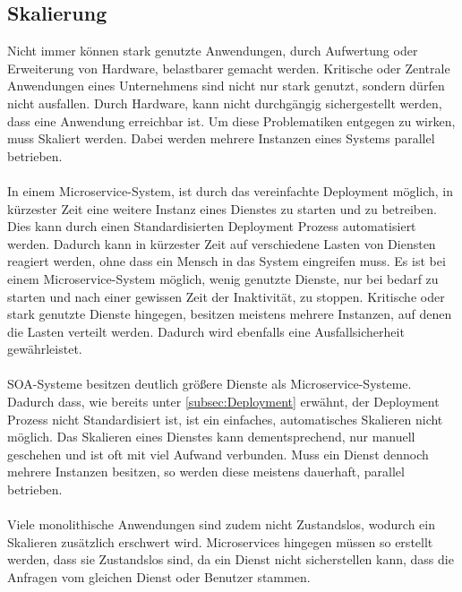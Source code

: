 \subsection{Skalierung}
\label{subsec:Skalierung}
Nicht immer können stark genutzte Anwendungen, durch Aufwertung oder Erweiterung von Hardware, belastbarer gemacht werden. Kritische oder Zentrale Anwendungen eines Unternehmens sind nicht nur stark genutzt, sondern dürfen nicht ausfallen. Durch Hardware, kann nicht durchgängig sichergestellt werden, dass eine Anwendung erreichbar ist. Um diese Problematiken entgegen zu wirken, muss Skaliert werden. Dabei werden mehrere Instanzen eines Systems parallel betrieben.
\\\\
In einem Microservice-System, ist durch das vereinfachte Deployment möglich, in kürzester Zeit eine weitere Instanz eines Dienstes zu starten und zu betreiben. Dies kann durch einen Standardisierten Deployment Prozess automatisiert werden. Dadurch kann in kürzester Zeit auf verschiedene Lasten von Diensten reagiert werden, ohne dass ein Mensch in das System eingreifen muss. Es ist bei einem Microservice-System möglich, wenig genutzte Dienste, nur bei bedarf zu starten und nach einer gewissen Zeit der Inaktivität, zu stoppen. Kritische oder stark genutzte Dienste hingegen, besitzen meistens mehrere Instanzen, auf denen die Lasten verteilt werden. Dadurch wird ebenfalls eine Ausfallsicherheit gewährleistet.
\\\\
SOA-Systeme besitzen deutlich größere Dienste als Microservice-Systeme. Dadurch dass, wie bereits unter \ref{subsec:Deployment}  erwähnt, der Deployment Prozess nicht Standardisiert ist, ist ein einfaches, automatisches Skalieren nicht möglich. Das Skalieren eines Dienstes kann dementsprechend, nur manuell geschehen und ist oft mit viel Aufwand verbunden. Muss ein Dienst dennoch mehrere Instanzen besitzen, so werden diese meistens dauerhaft, parallel betrieben.
\\\\
Viele monolithische Anwendungen sind zudem nicht Zustandslos, wodurch ein Skalieren zusätzlich erschwert wird. Microservices hingegen müssen so erstellt werden, dass sie Zustandslos sind, da ein Dienst nicht sicherstellen kann, dass die Anfragen vom gleichen Dienst oder Benutzer stammen.

